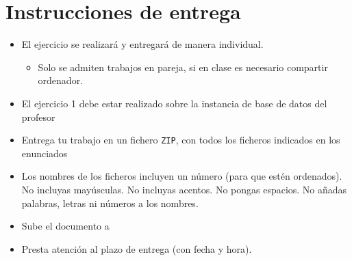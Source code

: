 \begin{homeworkProblem}
\begin{Aviso}
  \end{Aviso}

\end{homeworkProblem}

\newpage
\section{Instrucciones de entrega}
\begin{itemize}
\item El ejercicio se realizará y entregará de manera individual.
  \begin{itemize}
  \item Solo se admiten trabajos en pareja, si en clase es necesario compartir ordenador.
  \end{itemize}
\item El ejercicio 1 debe estar realizado sobre la instancia de base de datos del profesor
\item Entrega tu trabajo en un fichero \texttt{ZIP}, con todos los ficheros indicados en los enunciados
\item Los nombres de los ficheros incluyen un número (para que estén ordenados). No incluyas mayúsculas. No incluyas acentos. No pongas espacios. No añadas palabras, letras ni números a los nombres.
\item Sube el documento a 
\item Presta atención al plazo de entrega (con fecha y hora).  
\end{itemize}



